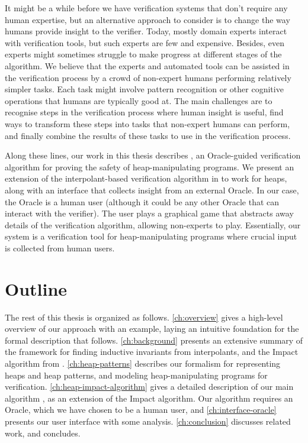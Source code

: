 It might be a while before we have verification systems that don't require any human
expertise, but an alternative approach to consider is to change the way humans provide
insight to the verifier. Today, mostly domain experts interact with verification tools,
but such experts are few and expensive. Besides, even experts might sometimes struggle to
make progress at different stages of the algorithm. We believe that the experts and
automated tools can be assisted in the verification process by a crowd of non-expert
humans performing relatively simpler tasks. Each task might involve pattern recognition
or other cognitive operations that humans are typically good at. The main challenges are
to recognise steps in the verification process where human insight is useful, find ways
to transform these steps into tasks that non-expert humans can perform, and finally
combine the results of these tasks to use in the verification process.

Along these lines, our work in this thesis describes \verifier, an Oracle-guided
verification algorithm for proving the safety of heap-manipulating programs. We present
an extension of the interpolant-based verification algorithm in \cite{mcmillan06} to work
for heaps, along with an interface that collects insight from an external Oracle. In our
case, the Oracle is a human user (although it could be any other Oracle that can interact
with the verifier). The user plays a graphical game that abstracts away details of the
verification algorithm, allowing non-experts to play. Essentially, our system is a
verification tool for heap-manipulating programs where crucial input is collected from
human users.

\section{Outline}

The rest of this thesis is organized as follows. \autoref{ch:overview} gives a high-level
overview of our approach with an example, laying an intuitive foundation for the formal
description that follows. \autoref{ch:background} presents an extensive summary of the
framework for finding inductive invariants from interpolants, and the Impact algorithm
from \cite{mcmillan06}. \autoref{ch:heap-patterns} describes our formalism for
representing heaps and heap patterns, and modeling heap-manipulating programs for
verification. \autoref{ch:heap-impact-algorithm} gives a detailed description of our
main algorithm \verifier, as an extension of the Impact algorithm. Our algorithm
requires an Oracle, which we have chosen to be a human user, and
\autoref{ch:interface-oracle} presents our user interface with some analysis.
\autoref{ch:conclusion} discusses related work, and concludes.

